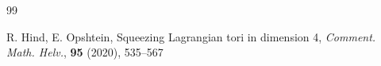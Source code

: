 \documentclass[12pt]{amsart}
\theoremstyle{definition}
\begin{document}
\begin{thebibliography} {99}

 R. Hind, E. Opshtein, Squeezing Lagrangian tori in dimension 4, {\em Comment. Math. Helv.}, \textbf{95} (2020), 535--567













\end{thebibliography}
\end{document}
